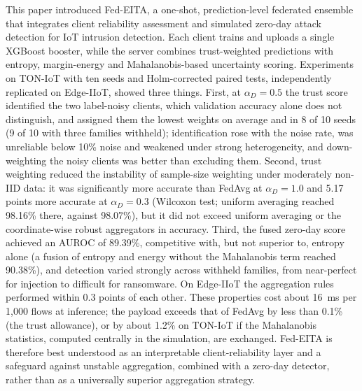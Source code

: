 \documentclass[pdflatex,sn-mathphys-num]{sn-jnl}
\newcommand{\Rtwo}{\color{blue}}
\begin{document}
{{{{This paper introduced Fed-EITA, a one-shot, prediction-level federated ensemble that integrates client reliability assessment and simulated zero-day attack detection for IoT intrusion detection. Each client trains and uploads a single XGBoost booster, while the server combines trust-weighted predictions with entropy, margin-energy and Mahalanobis-based uncertainty scoring. Experiments on TON-IoT with ten seeds and Holm-corrected paired tests, independently replicated on Edge-IIoT, showed three things. First, at $\alpha_D=0.5$ the trust score identified the two label-noisy clients, which validation accuracy alone does not distinguish, and assigned them the lowest weights {\Rtwo on average and in 8 of 10 seeds (9 of 10 with three families withheld); identification rose with the noise rate, was unreliable below 10\% noise and weakened under strong heterogeneity, and down-weighting the noisy clients was better than excluding them}. Second, trust weighting reduced the instability of sample-size weighting under moderately non-IID data: it was significantly more accurate than FedAvg at $\alpha_D=1.0$ and 5.17 points more accurate at $\alpha_D=0.3$ (Wilcoxon test{\Rtwo ; uniform averaging reached 98.16\% there, against 98.07\%}), but it did not exceed uniform averaging or the coordinate-wise robust aggregators in accuracy. Third, the fused zero-day score achieved an AUROC of 89.39\%, competitive with, but not superior to, entropy alone {\Rtwo (a fusion of entropy and energy without the Mahalanobis term reached 90.38\%)}, and detection varied strongly across withheld families, from near-perfect for injection to difficult for ransomware. On Edge-IIoT the aggregation rules performed within 0.3 points of each other. These properties cost about 16~ms per 1{,}000 flows at inference{\Rtwo ; the payload exceeds that of FedAvg by less than 0.1\% (the trust allowance), or by about 1.2\% on TON-IoT if the Mahalanobis statistics, computed centrally in the simulation, are exchanged}. Fed-EITA is therefore best understood as an interpretable client-reliability layer and a safeguard against unstable aggregation, combined with a zero-day detector, rather than as a universally superior aggregation strategy.
}}}}
\end{document}
